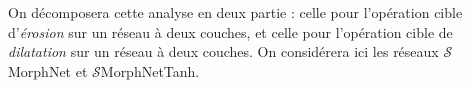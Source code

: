 \vspace{-1.2mm}
\noindent On décomposera cette analyse en deux partie : celle pour l'opération cible d'\textit{érosion} sur un réseau à deux couches, et celle pour l'opération cible de \textit{dilatation} sur un réseau à deux couches. On considérera ici les réseaux $\mathcal{S}$MorphNet et $\mathcal{S}$MorphNetTanh.

